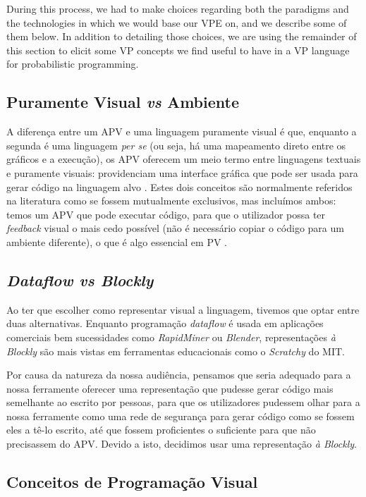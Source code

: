 \documentclass[9pt,a4paper]{extarticle}
\begin{document}
\begin{multicols}{2}
During this process, we had to make choices regarding both the paradigms and the
technologies in which we would base our VPE on, and we
describe some of them below. In addition to detailing those choices, we are
using the remainder of this section to elicit some VP concepts
we find useful to have in a VP language for probabilistic programming.

\subsection{Puramente Visual \textit{vs} Ambiente}

A diferença entre um APV e uma linguagem puramente visual é que, enquanto a segunda
é uma linguagem \textit{per se} (ou seja, há uma mapeamento direto entre os
gráficos e a execução), os APV oferecem um meio termo entre linguagens textuais
e puramente visuais: providenciam uma interface gráfica que pode ser usada para
gerar código na linguagem alvo \cite{Burnett1999}. Estes dois conceitos são
normalmente referidos na literatura como se fossem mutualmente exclusivos,
mas incluímos ambos: temos um APV que pode executar código, para que o utilizador
possa ter \textit{feedback} visual o mais cedo possível (não é necessário copiar
o código para um ambiente diferente), o que é algo essencial em PV \cite{Shu1988}.

\subsection{\textit{Dataflow vs Blockly}}

Ao ter que escolher como representar visual a linguagem, tivemos que optar entre
duas alternativas. Enquanto programação \textit{dataflow} é usada em aplicações
comerciais bem sucessidades como \textit{RapidMiner} ou \textit{Blender}, representações \textit{à Blockly}
são mais vistas em ferramentas educacionais como o \textit{Scratchy} do MIT.

Por causa da natureza da nossa audiência, pensamos que seria adequado para a nossa
ferramente oferecer uma representação que pudesse gerar código mais semelhante
ao escrito por pessoas, para que os utilizadores pudessem olhar para a nossa ferramente
como uma rede de segurança para gerar código como se fossem eles a tê-lo escrito,
até que fossem proficientes o suficiente para que não precisassem do APV. Devido
a isto, decidimos usar uma representação \textit{à Blockly}.

\subsection{Conceitos de Programação Visual}


\end{multicols}
\end{document}
